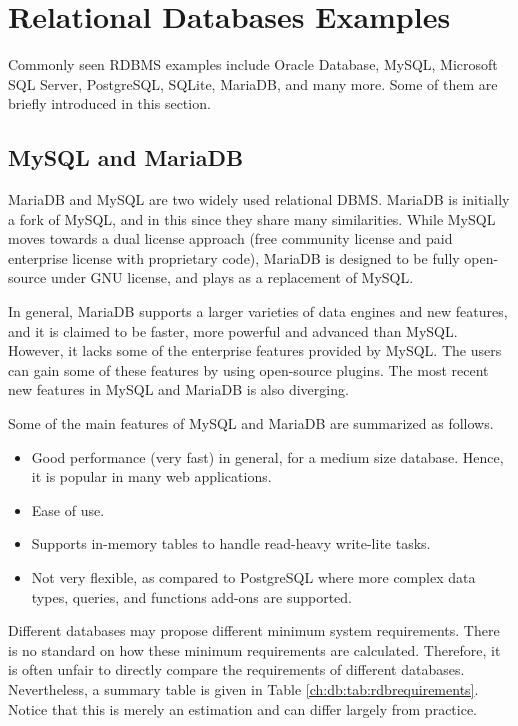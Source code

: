 \section{Relational Databases Examples}

Commonly seen RDBMS examples include Oracle Database, MySQL, Microsoft SQL Server, PostgreSQL, SQLite, MariaDB, and many more. Some of them are briefly introduced in this section.

\subsection{MySQL and MariaDB} \label{ch:db:sec:mariadb}

MariaDB and MySQL are two widely used relational DBMS. MariaDB is initially a fork of MySQL, and in this since they share many similarities. While MySQL moves towards a dual license approach (free community license and paid enterprise license with proprietary code), MariaDB is designed to be fully open-source under GNU license, and plays as a replacement of MySQL.

In general, MariaDB supports a larger varieties of data engines and new features, and it is claimed to be faster, more powerful and advanced than MySQL. However, it lacks some of the enterprise features provided by MySQL. The users can gain some of these features by using open-source plugins. The most recent new features in MySQL and MariaDB is also diverging.

Some of the main features of MySQL and MariaDB are summarized as follows.
\begin{itemize}
	\item Good performance (very fast) in general, for a medium size database. Hence, it is popular in many web applications.
	\item Ease of use.
	\item Supports in-memory tables to handle read-heavy write-lite tasks.
	\item Not very flexible, as compared to PostgreSQL where more complex data types, queries, and functions add-ons are supported.
\end{itemize}

Different databases may propose different minimum system requirements. There is no standard on how these minimum requirements are calculated. Therefore, it is often unfair to directly compare the requirements of different databases. Nevertheless, a summary table is given in Table \ref{ch:db:tab:rdbrequirements}. Notice that this is merely an estimation and can differ largely from practice.

